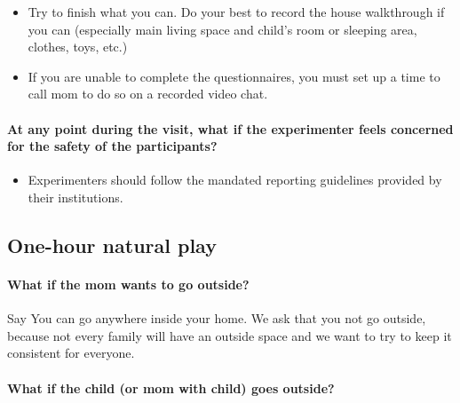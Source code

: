 \documentclass[
]{book}
\providecommand{\tightlist}{%
  \setlength{\itemsep}{0pt}\setlength{\parskip}{0pt}}
\begin{document}
\begin{itemize}
\tightlist
\item
  Try to finish what you can. Do your best to record the house walkthrough if you can (especially main living space and child's room or sleeping area, clothes, toys, etc.)
\item
  If you are unable to complete the questionnaires, you must set up a time to call mom to do so on a recorded video chat.
\end{itemize}

\hypertarget{at-any-point-during-the-visit-what-if-the-experimenter-feels-concerned-for-the-safety-of-the-participants}{%
\paragraph*{At any point during the visit, what if the experimenter feels concerned for the safety of the participants?}\label{at-any-point-during-the-visit-what-if-the-experimenter-feels-concerned-for-the-safety-of-the-participants}}

\begin{itemize}
\tightlist
\item
  Experimenters should follow the mandated reporting guidelines provided by their institutions.
\end{itemize}

\hypertarget{one-hour-natural-play}{%
\subsection{One-hour natural play}\label{one-hour-natural-play}}

\hypertarget{what-if-the-mom-wants-to-go-outside}{%
\paragraph*{What if the mom wants to go outside?}\label{what-if-the-mom-wants-to-go-outside}}

Say You can go anywhere inside your home. We ask that you not go outside, because not every family will have an outside space and we want to try to keep it consistent for everyone.

\hypertarget{what-if-the-child-or-mom-with-child-goes-outside}{%
\paragraph*{What if the child (or mom with child) goes outside?}\label{what-if-the-child-or-mom-with-child-goes-outside}}
\end{document}
